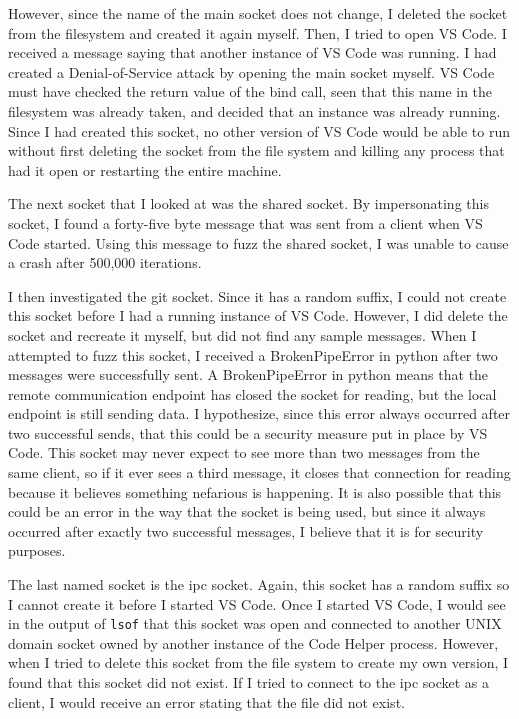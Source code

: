 However, since the name of the main socket does not change, I deleted the socket from the filesystem and created it again myself.  Then, I tried to open VS Code.  I received a message saying that another instance of VS Code was running.  I had created a Denial-of-Service attack by opening the main socket myself.  VS Code must have checked the return value of the bind call, seen that this name in the filesystem was already taken, and decided that an instance was already running.  Since I had created this socket, no other version of VS Code would be able to run without first deleting the socket from the file system and killing any process that had it open or restarting the entire machine.

The next socket that I looked at was the shared socket.  By impersonating this socket, I found a forty-five byte message that was sent from a client when VS Code started.  Using this message to fuzz the shared socket, I was unable to cause a crash after 500,000 iterations.

I then investigated the git socket.  Since it has a random suffix, I could not create this socket before I had a running instance of VS Code.  However, I did delete the socket and recreate it myself, but did not find any sample messages.  When I attempted to fuzz this socket, I received a BrokenPipeError in python after two messages were successfully sent.  A BrokenPipeError in python means that the remote communication endpoint has closed the socket for reading, but the local endpoint is still sending data.  I hypothesize, since this error always occurred after two successful sends, that this could be a security measure put in place by VS Code.  This socket may never expect to see more than two messages from the same client, so if it ever sees a third message, it closes that connection for reading because it believes something nefarious is happening.  It is also possible that this could be an error in the way that the socket is being used, but since it always occurred after exactly two successful messages, I believe that it is for security purposes.

The last named socket is the ipc socket.  Again, this socket has a random suffix so I cannot create it before I started VS Code.  Once I started VS Code, I would see in the output of \texttt{lsof} that this socket was open and connected to another UNIX domain socket owned by another instance of the Code Helper process.  However, when I tried to delete this socket from the file system to create my own version, I found that this socket did not exist.  If I tried to connect to the ipc socket as a client, I would receive an error stating that the file did not exist.

